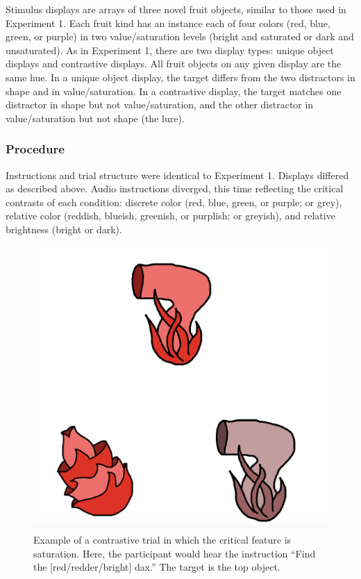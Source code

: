 \documentclass[10pt, letterpaper]{article}
\newenvironment{CodeChunk}{}{}
\begin{document}
Stimulus displays are arrays of three novel fruit objects, similar to
those used in Experiment 1. Each fruit kind has an instance each of four
colors (red, blue, green, or purple) in two value/saturation levels
(bright and saturated or dark and unsaturated). As in Experiment 1,
there are two display types: unique object displays and contrastive
displays. All fruit objects on any given display are the same hue. In a
unique object display, the target differs from the two distractors in
shape and in value/saturation. In a contrastive display, the target
matches one distractor in shape but not value/saturation, and the other
distractor in value/saturation but not shape (the lure).

\subsubsection{Procedure}\label{procedure-1}

Instructions and trial structure were identical to Experiment 1.
Displays differed as described above. Audio instructions diverged, this
time reflecting the critical contrasts of each condition: discrete color
(red, blue, green, or purple; or grey), relative color (reddish,
blueish, greenish, or purplish; or greyish), and relative brightness
(bright or dark).

\begin{CodeChunk}
\begin{figure}[H]

{\centering \includegraphics{figs/brightdarktrial-1} 

}

\caption[Example of a contrastive trial in which the critical feature is saturation]{Example of a contrastive trial in which the critical feature is saturation. Here, the participant would hear the instruction ``Find the [red/redder/bright] dax.'' The target is the top object.}\label{fig:brightdarktrial}
\end{figure}
\end{CodeChunk}
\end{document}
